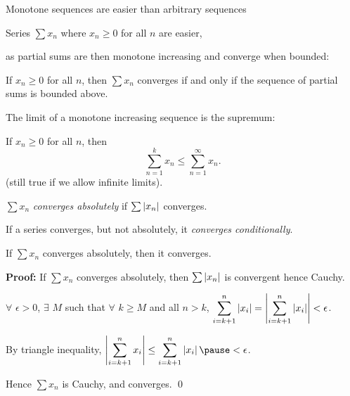 \documentclass[10pt,aspectratio=149]{beamer}
\begin{document}
\begin{frame}
Monotone sequences are easier than arbitrary sequences

\pause
\medskip

\quad \thus

\medskip

Series $\sum x_n$ where $x_n \geq 0$ for all $n$ are easier,

as partial sums are then monotone increasing and converge when bounded:

\pause
\begin{proposition}
If $x_n \geq 0$ for all $n$, then $\sum x_n$ converges if and only if
the sequence of partial sums is bounded above.
\end{proposition}

\pause
The limit of a monotone increasing sequence is the supremum:

\pause
If
$x_n \geq 0$ for all $n$, then
\begin{equation*}
\sum_{n=1}^k x_n \leq
\sum_{n=1}^\infty x_n .
\end{equation*}
\pause
(still true if we allow infinite limits).

\end{frame}

\begin{frame}

\begin{definition}
$\sum x_n$
\emph{converges absolutely} if
$\sum \left\lvert {x_n} \right\rvert$ converges.

\pause
If a series converges, but not absolutely,
it \emph{converges conditionally}.
\end{definition}

\pause
\begin{proposition}
If $\sum x_n$ converges absolutely, then it converges.
\end{proposition}

\pause
\textbf{Proof:}
If $\sum x_n$ converges absolutely, then
$\sum \left\lvert {x_n} \right\rvert$ is convergent hence Cauchy.

\pause
\medskip

$\forall$ $\epsilon > 0$,
$\exists$ $M$ such that $\forall$ $k \geq M$ and all $n > k$,
\quad
$\displaystyle
\sum_{i=k+1}^n \left\lvert {x_i} \right\rvert 
=
\left\lvert { \sum_{i=k+1}^n \left\lvert {x_i} \right\rvert } \right\rvert
<
\epsilon$.

\pause
\medskip

By triangle inequality, \quad
$\displaystyle
\abs{ \sum_{i=k+1}^n x_i }
\leq
\sum_{i=k+1}^n \abs{x_i}
\pause
<
\epsilon$.

\pause
\medskip

Hence $\sum x_n$ is Cauchy, and converges.
\qed

\end{frame}
\end{document}
